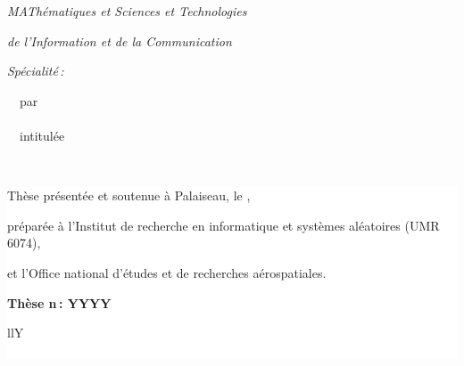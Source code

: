 {\begin{titlepage}
{  \medskip

  \emph{MAThématiques et Sciences et Technologies}

  \emph{de l'Information et de la Communication}

  \emph{Spécialité\,: \@specialite}

        \medskip
        ~~par\\
        \medskip
        {\Huge\hspace{2cm} \textbf{~~~\@author}}\\

        \medskip
        ~~intitulée\\
        \medskip

        {\LARGE~~~\@title}

        \medskip
        \vspace*{0.01\paperheight}

        \colorbox{white}{\begin{minipage}{0.9\textwidth}
        \medskip
        Thèse présentée et soutenue à Palaiseau, le \@date,

        préparée à l'Institut de recherche en informatique et systèmes aléatoires (UMR 6074),

        et l'Office national d'études et de recherches aérospatiales.

        \medskip
        \textbf{Thèse n\,: YYYY}

        \vspace*{0.03\paperheight}
        \begin{tabularx}{\textwidth}{llY}
          \\
          \\
          \@rapporteura
          \@rapporteurb
        \end{tabularx}

        \medskip


\end{minipage}}}
\end{titlepage}}
